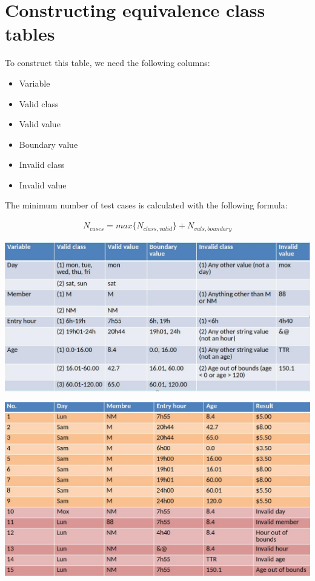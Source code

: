 \documentclass[12pt]{book}
\begin{document}
\chapter{Constructing equivalence class tables}
To construct this table, we need the following columns:

\begin{itemize}
    \item Variable
    \item Valid class
    \item Valid value
    \item Boundary value
    \item Invalid class
    \item Invalid value
\end{itemize}

The minimum number of test cases is calculated with the following formula:

\begin{align*}
    N_{cases}=max\{N_{class,valid}\}+N_{vals,boundary}
\end{align*}

\includegraphics*[scale=0.4]{images/equivtable.jpg}

\includegraphics*[scale=0.4]{images/testtable.jpg}
\end{document}
